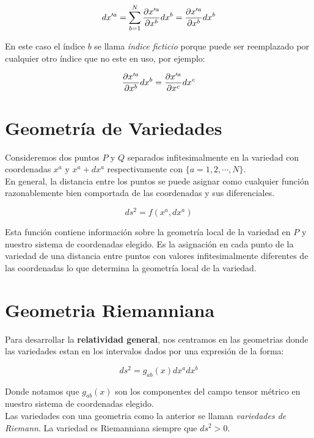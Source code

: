 \documentclass[../main]{subfiles}
\begin{document}
\begin{equation}
    dx'^a=\sum_{b=1}^N \pdv{x'^a}{x^b}dx^b=\pdv{x'^a}{x^b}dx^b
\end{equation}

En este caso el índice $b$ se llama \textit{índice ficticio} porque puede ser reemplazado por cualquier otro índice que no este en uso, por ejemplo:

\begin{equation*}
    \pdv{x'^a}{x^b}dx^b=\pdv{x'^a}{x^c}dx^c
\end{equation*}

\section{Geometría de Variedades}

Consideremos dos puntos $P$ y $Q$ separados infitesimalmente en la variedad con coordenadas $x^a$ y $x^a+dx^a$ respectivamente con $\{ a=1,2,\cdots,N \}$. \\
En general, la distancia entre los puntos se puede asignar como cualquier función razonablemente bien comportada de las coordenadas y sus diferenciales.

\begin{equation}
    ds^2=f(x^a,dx^a)
\end{equation}

Esta función contiene información sobre la geometría local de la variedad en $P$ y nuestro sistema de coordenadas elegido. Es la asignación en cada punto de la variedad de una distancia entre puntos con valores infitesimalmente diferentes de las coordenadas lo que determina la geometría local de la variedad.

\section{Geometria Riemanniana}

Para desarrollar la \textbf{relatividad general}, nos centramos en las geometrias donde las variedades estan en los intervalos dados por una expresión de la forma:

\begin{equation}
    ds^2=g_{ab}(x) dx^a dx^b
\end{equation}

Donde notamos que $g_{ab}(x)$ son los componentes del campo tensor métrico en nuestro sistema de coordenadas elegido. \\

Las variedades con una geometria como la anterior se llaman \textit{variedades de Riemann}. La variedad es Riemanniana siempre que $ds^2>0$.
\end{document}

